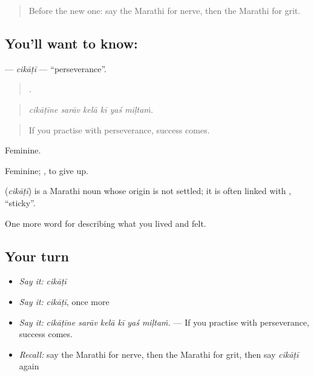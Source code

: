 \label{lesson:MR-C464-cikati}



\begin{quote}
Before the new one: say the Marathi for nerve, then the Marathi for grit.
\end{quote}

\subsection*{You'll want to know: }
\textbf{} — \emph{cikāṭī} — \textquotedblleft{}perseverance\textquotedblright{}.

\begin{quote}
     .
\end{quote}

\begin{quote}
\emph{cikāṭīne sarāv kelā kī yaś miḷtaṁ.}
\end{quote}

\begin{quote}
If you practise with perseverance, success comes.
\end{quote}

Feminine.

Feminine;  , to give up.

\begin{cousinweb}
\textbf{} (\emph{cikāṭī}) is a Marathi noun whose origin is not settled; it is often linked with , \textquotedblleft{}sticky\textquotedblright{}.
\end{cousinweb}

\begin{grammarlens}[title={What you've built}]
One more word for describing what you lived and felt.
\end{grammarlens}

\subsection*{Your turn}
\begin{itemize}
\raggedright
  \item \emph{Say it:} \emph{cikāṭī}
  \item \emph{Say it:} \emph{cikāṭī}, once more
  \item \emph{Say it:} \emph{cikāṭīne sarāv kelā kī yaś miḷtaṁ.} — If you practise with perseverance, success comes.
  \item \emph{Recall:} say the Marathi for nerve, then the Marathi for grit, then say \emph{cikāṭī} again
\end{itemize}


